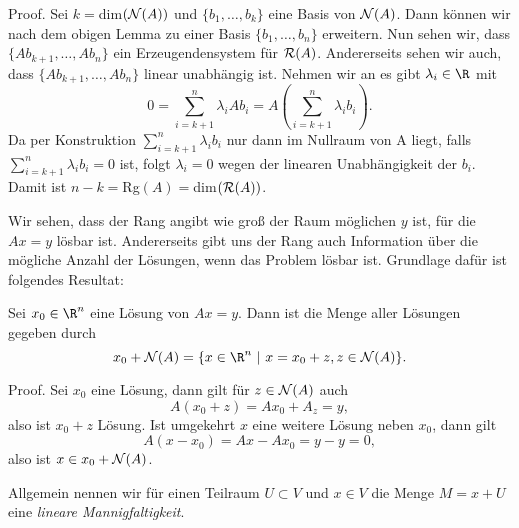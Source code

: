 \documentclass[letterpaper,10pt,english]{jupyterBook}
\begin{document}
\begin{emphBox}{}{}
Proof.  Sei \(k=\)dim\(({\cal N}(A))\) und \(\{b_1,\ldots,b_k\}\) eine Basis von \({\cal N}(A)\). Dann können wir nach dem obigen Lemma zu einer Basis \(\{b_1,\ldots,b_n\}\) erweitern. Nun sehen wir, dass \(\{Ab_{k+1},\ldots,Ab_n\}\) ein Erzeugendensystem für \({\cal R}(A)\). Andererseits sehen wir auch, dass \(\{Ab_{k+1},\ldots,Ab_n\}\) linear unabhängig ist. Nehmen wir an es gibt \(\lambda_i \in \R\) mit
\begin{equation*}
 0 = \sum_{i=k+1}^n \lambda_i A b_i = A(\sum_{i=k+1}^n \lambda_i b_i).
\end{equation*}
Da per Konstruktion \(\sum_{i=k+1}^n \lambda_i b_i\) nur dann im Nullraum von A liegt, falls \(\sum_{i=k+1}^n \lambda_i b_i = 0\) ist, folgt \(\lambda_i=0\)  wegen der linearen Unabhängigkeit der \(b_i\).
Damit ist \(n-k=\)Rg\((A)=\)dim\(({\cal R}(A))\).
\end{emphBox}

Wir sehen, dass der Rang angibt wie groß der Raum möglichen \(y\) ist, für die \(Ax = y\) lösbar ist. Andererseits gibt uns der Rang auch Information über die mögliche Anzahl der Lösungen, wenn das Problem lösbar ist. Grundlage dafür ist folgendes Resultat:
\label{vektorraeume/LGS:lemma-3}
\begin{lemma}{}{}



Sei \(x_0 \in \R^n\) eine Lösung von \(A x = y\). Dann ist die Menge aller Lösungen gegeben durch
\begin{equation*}
 x_0 + {\cal N}(A) = \{ x \in \R^n ~|~x=x_0+z, z \in {\cal N}(A)\}.
\end{equation*}\end{lemma}

\begin{emphBox}{}{}
Proof.  Sei \(x_0\) eine Lösung, dann gilt für \(z \in {\cal N}(A)\) auch
\begin{equation*}
 A(x_0+z) = Ax_0  + A_z =y,
\end{equation*}
also ist \(x_0 + z\) Lösung. Ist umgekehrt \(x\) eine weitere Lösung neben \(x_0\), dann gilt
\begin{equation*}
 A(x-x_0)  = Ax - Ax_0= y - y=0,
\end{equation*}
also ist \(x \in x_0 + {\cal N}(A)\).
\end{emphBox}

Allgemein nennen wir für einen Teilraum \(U \subset V\) und \(x \in V\) die Menge  \(M= x + U\) eine \emph{lineare Mannigfaltigkeit}.
\end{document}
